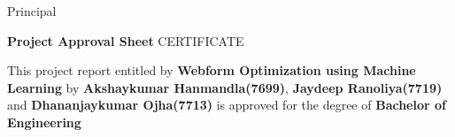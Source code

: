 \documentclass[12pt]{report}
\begin{document}
Principal
\newpage
\begin{center}
\begin{Huge}
\hspace*{28px}
\textbf{ Project Approval Sheet }
\newline
\newline
\newline
\vspace*{23px}
CERTIFICATE
\end{Huge}
\end{center}
\vspace*{50px}
This project report entitled by \textbf{Webform Optimization using Machine Learning} by\textbf{ Akshaykumar  Hanmandla(7699)}, \textbf{Jaydeep Ranoliya(7719)} and \textbf{Dhananjaykumar  Ojha(7713)} is approved for the degree of \textbf{Bachelor of Engineering}
\end{document}
